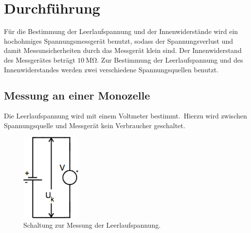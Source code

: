 \section{Durchführung}
\label{sec:Durchfuehrung}
Für die Bestimmung der Leerlaufspannung und der Innenwiderstände wird ein hochohmiges Spannungsmessgerät benutzt, sodass der Spannungsverlust und damit Messunsicherheiten durch das Messgerät klein sind.
Der Innenwiderstand des Messgerätes beträgt $\SI{10}{\mega\ohm}$.
Zur Bestimmung der Leerlaufspannung und des Innenwiderstandes werden zwei verschiedene Spannungsquellen benutzt.

\subsection{Messung an einer Monozelle}
\label{sec:drchf_monozelle}
Die Leerlaufspannung wird mit einem Voltmeter bestimmt.\
Hierzu wird zwischen Spannungsquelle und Messgerät kein Verbraucher geschaltet.
\begin{figure}
	\centering
	\includegraphics[width=3cm]{Bilder/Leerlauf.pdf}
	\caption{Schaltung zur Messung der Leerlaufspannung.}
	\label{fig:leerlauf}
\end{figure}

